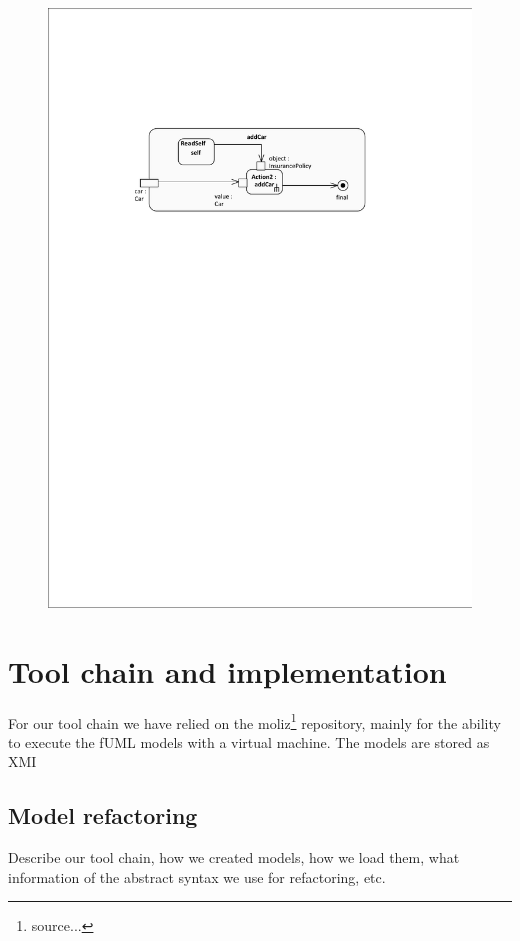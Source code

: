 \documentclass{llncs}
\begin{document}
\begin{figure}[ht]
 \centering
 \includegraphics{images/addCar-activity_diagram}
\end{figure}

\section{Tool chain and implementation}
For our tool chain we have relied on the moliz\footnote{source...} repository, mainly for the ability to execute the fUML models with
a virtual machine. The models are stored as XMI 

\subsection{Model refactoring}
Describe our tool chain, how we created models, how we load them, what information of the abstract syntax we use for refactoring, etc.
\end{document}
